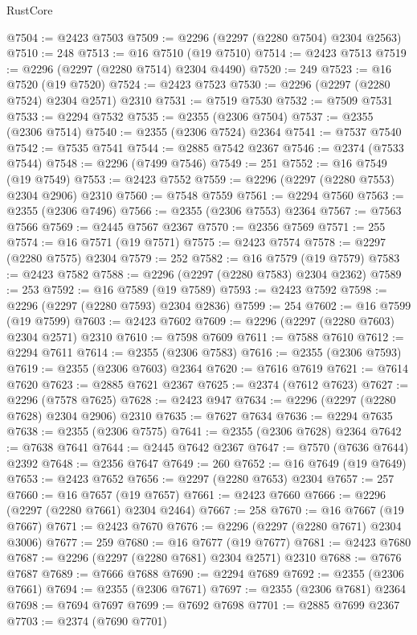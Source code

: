 \begin{lexlean}{RustCore}
\begin{coremodule}
@7504 := @2423 @7503
@7509 := @2296 (@2297 (@2280 @7504) @2304 @2563)
@7510 := 248
@7513 := @16 @7510 (@19 @7510)
@7514 := @2423 @7513
@7519 := @2296 (@2297 (@2280 @7514) @2304 @4490)
@7520 := 249
@7523 := @16 @7520 (@19 @7520)
@7524 := @2423 @7523
@7530 := @2296 (@2297 (@2280 @7524) @2304 @2571) @2310
@7531 := @7519 @7530
@7532 := @7509 @7531
@7533 := @2294 @7532
@7535 := @2355 (@2306 @7504)
@7537 := @2355 (@2306 @7514)
@7540 := @2355 (@2306 @7524) @2364
@7541 := @7537 @7540
@7542 := @7535 @7541
@7544 := @2885 @7542 @2367
@7546 := @2374 (@7533 @7544)
@7548 := @2296 (@7499 @7546)
@7549 := 251
@7552 := @16 @7549 (@19 @7549)
@7553 := @2423 @7552
@7559 := @2296 (@2297 (@2280 @7553) @2304 @2906) @2310
@7560 := @7548 @7559
@7561 := @2294 @7560
@7563 := @2355 (@2306 @7496)
@7566 := @2355 (@2306 @7553) @2364
@7567 := @7563 @7566
@7569 := @2445 @7567 @2367
@7570 := @2356 @7569
@7571 := 255
@7574 := @16 @7571 (@19 @7571)
@7575 := @2423 @7574
@7578 := @2297 (@2280 @7575) @2304
@7579 := 252
@7582 := @16 @7579 (@19 @7579)
@7583 := @2423 @7582
@7588 := @2296 (@2297 (@2280 @7583) @2304 @2362)
@7589 := 253
@7592 := @16 @7589 (@19 @7589)
@7593 := @2423 @7592
@7598 := @2296 (@2297 (@2280 @7593) @2304 @2836)
@7599 := 254
@7602 := @16 @7599 (@19 @7599)
@7603 := @2423 @7602
@7609 := @2296 (@2297 (@2280 @7603) @2304 @2571) @2310
@7610 := @7598 @7609
@7611 := @7588 @7610
@7612 := @2294 @7611
@7614 := @2355 (@2306 @7583)
@7616 := @2355 (@2306 @7593)
@7619 := @2355 (@2306 @7603) @2364
@7620 := @7616 @7619
@7621 := @7614 @7620
@7623 := @2885 @7621 @2367
@7625 := @2374 (@7612 @7623)
@7627 := @2296 (@7578 @7625)
@7628 := @2423 @947
@7634 := @2296 (@2297 (@2280 @7628) @2304 @2906) @2310
@7635 := @7627 @7634
@7636 := @2294 @7635
@7638 := @2355 (@2306 @7575)
@7641 := @2355 (@2306 @7628) @2364
@7642 := @7638 @7641
@7644 := @2445 @7642 @2367
@7647 := @7570 (@7636 @7644) @2392
@7648 := @2356 @7647
@7649 := 260
@7652 := @16 @7649 (@19 @7649)
@7653 := @2423 @7652
@7656 := @2297 (@2280 @7653) @2304
@7657 := 257
@7660 := @16 @7657 (@19 @7657)
@7661 := @2423 @7660
@7666 := @2296 (@2297 (@2280 @7661) @2304 @2464)
@7667 := 258
@7670 := @16 @7667 (@19 @7667)
@7671 := @2423 @7670
@7676 := @2296 (@2297 (@2280 @7671) @2304 @3006)
@7677 := 259
@7680 := @16 @7677 (@19 @7677)
@7681 := @2423 @7680
@7687 := @2296 (@2297 (@2280 @7681) @2304 @2571) @2310
@7688 := @7676 @7687
@7689 := @7666 @7688
@7690 := @2294 @7689
@7692 := @2355 (@2306 @7661)
@7694 := @2355 (@2306 @7671)
@7697 := @2355 (@2306 @7681) @2364
@7698 := @7694 @7697
@7699 := @7692 @7698
@7701 := @2885 @7699 @2367
@7703 := @2374 (@7690 @7701)

\end{coremodule}
\end{lexlean}
